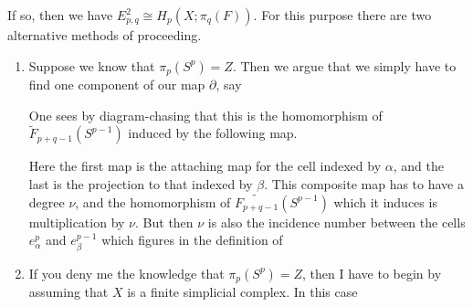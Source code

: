 \documentclass[../main]{subfiles}
\begin{document}
\begin{center}
\end{center}

If so, then we have $E_{p,q}^2\cong H_p(X;\pi_q(F))$. For this purpose there are two alternative methods of proceeding.
\begin{enumerate}
    \item Suppose we know that $\pi_p(S^p)=Z$. Then we argue that we simply have to find one component of our map $\partial$, say
    \begin{center}
    \end{center}
    One sees by diagram-chasing that this is the homomorphism of $\tilde{F}_{p+q-1}(S^{p-1})$ induced by the following map.
    \begin{center}
    \end{center}
    Here the first map is the attaching map for the cell indexed by $\alpha$, and the last is the projection to that indexed by $\beta$. This composite map has to have a degree $\nu$, and the homomorphism of $\widetilde{F_{p+q-1}}(S^{p-1})$ which it induces is multiplication by $\nu$. But then $\nu$ is also the incidence number between the cells $e_{\alpha}^p$ and $e_{\beta}^{p-1}$ which figures in the definition of \begin{center}
    \end{center}
    \item If you deny me the knowledge that $\pi_p(S^p)=Z$, then I have to begin by assuming that $X$ is a finite simplicial complex. In this case 

\end{enumerate}
\end{document}
